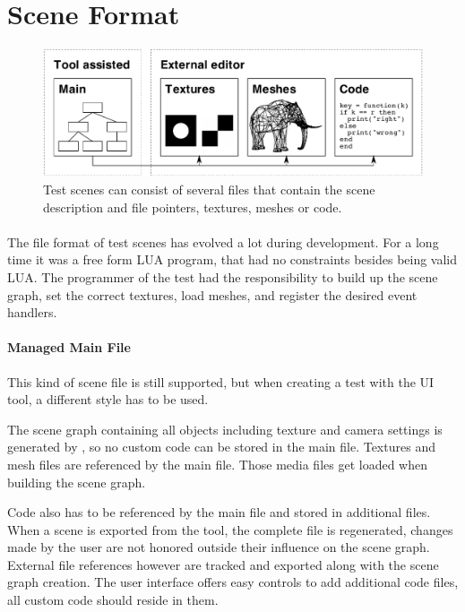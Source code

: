 \section{Scene Format\label{Format}}

\begin{figure}[htb]
\begin{center}
\includegraphics[width=15.5cm]{media/document.pdf}
\caption{Test scenes can consist of several files that contain the scene description and file pointers, textures, meshes or code.\label{imgDocument}}
\end{center}
\end{figure}

\paragraph{}
The file format of test scenes has evolved a lot during development.
For a long time it was a free form LUA program, that had no constraints besides being valid LUA.
The programmer of the test had the responsibility to build up the scene graph, set the correct textures, load meshes, and register the desired event handlers.

\paragraph{Managed Main File}
This kind of scene file is still supported, but when creating a test with the UI tool, a different style has to be used.

The scene graph containing all objects including texture and camera settings is generated by \ER, so no custom code can be stored in the main file.
Textures and mesh files are referenced by the main file.
Those media files get loaded when building the scene graph.

Code also has to be referenced by the main file and stored in additional files.
When a scene is exported from the tool, the complete file is regenerated, changes made by the user are not honored outside their influence on the scene graph.
External file references however are tracked and exported along with the scene graph creation.
The user interface offers easy controls to add additional code files, all custom code should reside in them.

